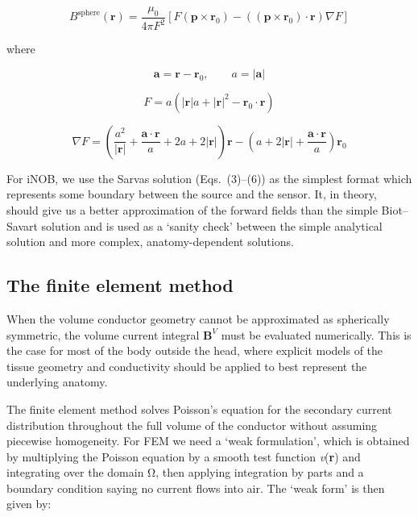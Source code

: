 \documentclass[11pt]{article}
\begin{document}
\begin{equation}
B^{\text{sphere}}\left( \mathbf{r} \right) = \frac{\mu_{0}}{4\pi F^{2}}\left\lbrack F\left( \mathbf{p}\times\mathbf{r}_{0} \right) - \left( \left(\mathbf{p}\times\mathbf{r}_{0}\right)\cdot\mathbf{r} \right)\nabla F \right\rbrack
\tag{3}
\end{equation}

where

\begin{equation}
\mathbf{a} = \mathbf{r} - \mathbf{r}_{0}, \qquad a = |\mathbf{a}|
\tag{4}
\end{equation}

\begin{equation}
F = a(\left| \mathbf{r} \right|a + \left| \mathbf{r} \right|^{2} - \mathbf{r}_{0}\cdot\mathbf{r})
\tag{5}
\end{equation}

\begin{equation}
\nabla F = \left( \frac{a^{2}}{|\mathbf{r}|} + \frac{\mathbf{a}\cdot\mathbf{r}}{a} + 2a + 2|\mathbf{r}| \right)\mathbf{r} - \left( a + 2|\mathbf{r}| + \frac{\mathbf{a}\cdot\mathbf{r}}{a} \right)\mathbf{r}_{0}
\tag{6}
\end{equation}

For iNOB, we use the Sarvas solution (Eqs.~(3)--(6)) as the simplest format
which represents some boundary between the source and the sensor. It, in
theory, should give us a better approximation of the forward fields than
the simple Biot--Savart solution and is used as a `sanity
check' between the simple analytical solution and more
complex, anatomy-dependent solutions.

\subsection{The finite element method}\label{the-finite-element-method}

When the volume conductor geometry cannot be approximated as spherically
symmetric, the volume current integral \(\mathbf{B}^{V}\) must be
evaluated numerically. This is the case for most of the body outside the
head, where explicit models of the tissue geometry and conductivity
should be applied to best represent the underlying anatomy.

The finite element method solves Poisson's equation for
the secondary current distribution throughout the full volume of the
conductor without assuming piecewise homogeneity. For FEM we need a
`weak formulation', which is obtained by
multiplying the Poisson equation by a smooth test function
\emph{v}(\textbf{r}) and integrating over the domain Ω, then applying
integration by parts and a boundary condition saying no current flows
into air. The `weak form' is then given
by:
\end{document}
